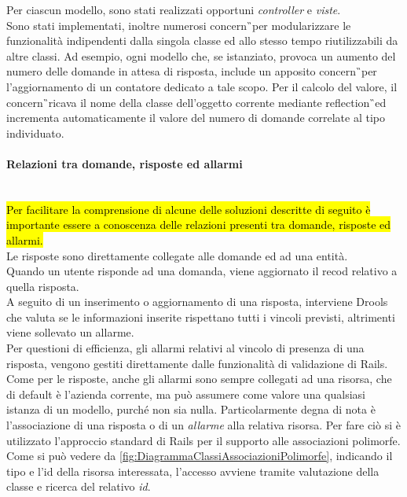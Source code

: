 Per ciascun modello, sono stati realizzati opportuni \textit{controller} e \textit{viste}. \\
Sono stati implementati, inoltre numerosi \gls{concern}\G\ per modularizzare le funzionalità indipendenti dalla singola classe ed allo stesso tempo riutilizzabili da altre classi. Ad esempio, ogni modello che, se istanziato, provoca un aumento del numero delle domande in attesa di risposta, include un apposito \gls{concern}\G\ per l'aggiornamento di un contatore dedicato a tale scopo. Per il calcolo del valore, il \gls{concern}\G\ ricava il nome della classe dell'oggetto corrente mediante \gls{reflection}\G\ ed incrementa automaticamente il valore del numero di domande correlate al tipo individuato.\\

\paragraph*{Relazioni tra domande, risposte ed allarmi}\mbox{} \\
\hl{Per facilitare la comprensione di alcune delle soluzioni descritte di seguito è importante essere a conoscenza delle relazioni presenti tra domande, risposte ed allarmi.}\\
Le risposte sono direttamente collegate alle domande ed ad una entità. \\Quando un utente risponde ad una domanda, viene aggiornato il recod relativo a quella risposta.\\
A seguito di un inserimento o aggiornamento di una risposta, interviene Drools che valuta se le informazioni inserite rispettano tutti i vincoli previsti, altrimenti viene sollevato un allarme. \\ 
Per questioni di efficienza, gli allarmi relativi al vincolo di presenza  di una risposta, vengono gestiti direttamente dalle funzionalità di validazione di Rails.\\
Come per le risposte, anche gli allarmi sono sempre collegati ad una risorsa, che di default è l'azienda corrente, ma può assumere come valore una qualsiasi istanza di un modello, purché non sia nulla.
Particolarmente degna di nota è l'associazione di una risposta o di un \textit{allarme} alla relativa risorsa. Per fare ciò si è utilizzato l'approccio standard di Rails per il supporto alle associazioni polimorfe. \\  
Come si può vedere da  \autoref{fig:DiagrammaClassiAssociazioniPolimorfe}, indicando il tipo e l'id della risorsa interessata, l'accesso avviene tramite valutazione della classe e ricerca del relativo \textit{id}. \\
